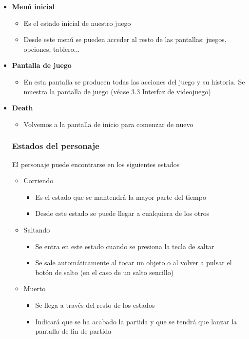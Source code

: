 \documentclass[palatino]{apuntes}
\begin{document}
\begin{itemize}
    \item \textbf{Menú inicial}
        \begin{itemize}
            \item Es el estado inicial de nuestro juego
            \item Desde este menú se pueden acceder al resto de las pantallas: juegos, opciones, tablero...
        \end{itemize}
    \item \textbf{Pantalla de juego}
        \begin{itemize}
            \item En esta pantalla se producen todas las acciones del juego y su historia. Se muestra la pantalla de juego (véase 3.3 Interfaz de videojuego)
        \end{itemize}
    
    \item \textbf{Death}
        \begin{itemize}
            \item Volvemos a la pantalla de inicio para comenzar de nuevo
            
\end{itemize}


\subsubsection{Estados del personaje}
El personaje puede encontrarse en los siguientes estados

\begin{itemize}
    \item Corriendo
    \begin{itemize}
        \item Es el estado que se mantendrá la mayor parte del tiempo
        \item Desde este estado se puede llegar a cualquiera de los otros
    \end{itemize}
    \item Saltando
    \begin{itemize}
        \item Se entra en este estado cuando se presiona la tecla de saltar
        \item Se sale automáticamente al tocar un objeto o al volver a pulsar el botón de salto (en el caso de un salto sencillo)
    \end{itemize}
    \item Muerto
    \begin{itemize}
        \item Se llega a través del resto de los estados
        \item Indicará que se ha acabado la partida y que se tendrá que lanzar la pantalla de fin de partida
    \end{itemize}
\end{itemize}



\end{itemize}
\end{document}
